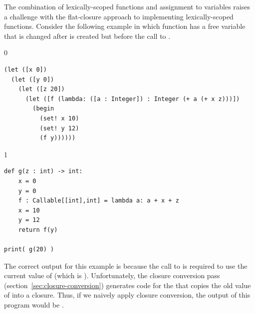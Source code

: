\documentclass[7x10]{TimesAPriori_MIT}%
\def\racketEd{0}
\def\pythonEd{1}
\def\edition{0}
\numberwithin{theorem}{chapter}
\numberwithin{definition}{chapter}
\numberwithin{equation}{chapter}
\begin{document}
The combination of lexically-scoped functions and assignment to
variables raises a challenge with the flat-closure approach to
implementing lexically-scoped functions. Consider the following
example in which function  has a free variable  that
is changed after  is created but before the call to .
{\if\edition\racketEd
\begin{lstlisting}
(let ([x 0])
  (let ([y 0])
    (let ([z 20])
      (let ([f (lambda: ([a : Integer]) : Integer (+ a (+ x z)))])
        (begin
          (set! x 10)
          (set! y 12)
          (f y))))))
\end{lstlisting}
\fi}
{\if\edition\pythonEd
\begin{lstlisting}
def g(z : int) -> int:
    x = 0
    y = 0  
    f : Callable[[int],int] = lambda a: a + x + z
    x = 10
    y = 12
    return f(y)

print( g(20) )
\end{lstlisting}
\fi} The correct output for this example is  because the call
to  is required to use the current value of  (which is
). Unfortunately, the closure conversion pass
(section~\ref{sec:closure-conversion}) generates code for the
 that copies the old value of  into a
closure. Thus, if we naively apply closure conversion, the output of
this program would be .
\end{document}
